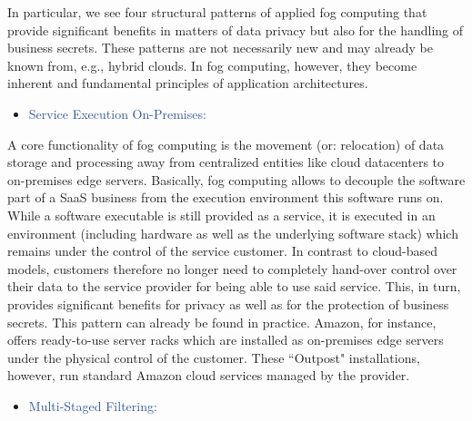 \documentclass[11pt]{article}
\begin{document}
{\large In particular, we see four structural patterns of applied fog computing that provide significant benefits in matters of data privacy but also for the handling of business secrets. These patterns are not necessarily new and may already be known from, e.g., hybrid clouds. In fog computing, however, they become inherent and fundamental principles of application architectures.\par}

\vspace{1\baselineskip}
\begin{itemize}
\item {\Large \textcolor[HTML]{2F5496}{Service Execution On-Premises:}}
\end{itemize}

{\large A core functionality of fog computing is the movement (or: relocation) of data storage and processing away from centralized entities like cloud datacenters to on-premises edge servers. Basically, fog computing allows to decouple the software part of a SaaS business from the execution environment this software runs on. While a software executable is still provided as a service, it is executed in an environment (including hardware as well as the underlying software stack) which remains under the control of the service customer. In contrast to cloud-based models, customers therefore no longer need to completely hand-over control over their data to the service provider for being able to use said service. This, in turn, provides significant benefits for privacy as well as for the protection of business secrets. This pattern can already be found in practice. Amazon, for instance, offers ready-to-use server racks which are installed as on-premises edge servers under the physical control of the customer. These ``Outpost" installations, however, run standard Amazon cloud services managed by the provider.\par}

\vspace{1\baselineskip}
\begin{itemize}
\item {\Large \textcolor[HTML]{2F5496}{Multi-Staged Filtering:}}
\end{itemize}
\end{document}
